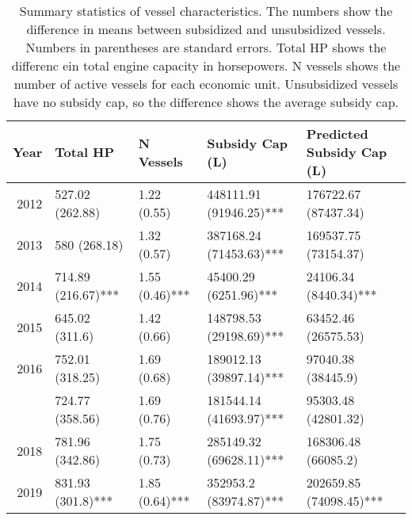 \begin{table}

\caption{\label{tab:}Summary statistics of vessel characteristics.
               The numbers show the difference in means between subsidized and unsubsidized vessels.
               Numbers in parentheses are standard errors.
               Total HP shows the differenc ein total engine capacity in horsepowers.
               N vessels shows the number of active vessels for each economic unit.
               Unsubsidized vessels have no subsidy cap, so the difference shows the average subsidy cap.}
\centering
\begin{tabular}[t]{rllll}
\toprule
Year & Total HP & N Vessels & Subsidy Cap (L) & Predicted Subsidy Cap (L)\\
\midrule
2012 & 527.02 (262.88) & 1.22 (0.55) & 448111.91 (91946.25)*** & 176722.67 (87437.34)\\
2013 & 580 (268.18) & 1.32 (0.57) & 387168.24 (71453.63)*** & 169537.75 (73154.37)\\
2014 & 714.89 (216.67)*** & 1.55 (0.46)*** & 45400.29 (6251.96)*** & 24106.34 (8440.34)***\\
2015 & 645.02 (311.6) & 1.42 (0.66) & 148798.53 (29198.69)*** & 63452.46 (26575.53)\\
2016 & 752.01 (318.25) & 1.69 (0.68) & 189012.13 (39897.14)*** & 97040.38 (38445.9)\\
\addlinespace
2017 & 724.77 (358.56) & 1.69 (0.76) & 181544.14 (41693.97)*** & 95303.48 (42801.32)\\
2018 & 781.96 (342.86) & 1.75 (0.73) & 285149.32 (69628.11)*** & 168306.48 (66085.2)\\
2019 & 831.93 (301.8)*** & 1.85 (0.64)*** & 352953.2 (83974.87)*** & 202659.85 (74098.45)***\\
\bottomrule
\end{tabular}
\end{table}